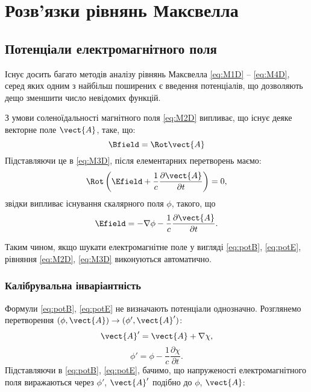 
\chapter{Розв’язки рівнянь Максвелла}\label{\currfilebase}

\section{Потенціали електромагнітного поля}

Існує досить багато методів аналізу рівнянь Максвелла \eqref{eq:M1D} -- \eqref{eq:M4D}, серед яких одним з найбільш поширених є введення потенціалів, що
дозволяють дещо
зменшити число невідомих функцій.

З умови соленоїдальності магнітного поля \eqref{eq:M2D} випливає, що існує деяке векторне поле $\vect{A}$, таке, що:
\begin{equation}\label{eq:potB}
	 \Bfield = \Rot\vect{A}
\end{equation}
Підставляючи це в \eqref{eq:M3D}, після елементарних перетворень маємо:
\begin{equation*}
	\Rot \left( \Efield + \frac{1}{c} \frac{\partial \vect{A}}{\partial t}\right)  = 0,
\end{equation*}
звідки випливає існування скалярного поля $\phi$, такого, що
\begin{equation}\label{eq:potE}
	\Efield = -\nabla \phi - \frac{1}{c} \frac{\partial \vect{A}}{\partial t}.
\end{equation}

Таким чином, якщо шукати електромагнітне поле у вигляді \eqref{eq:potB}, \eqref{eq:potE}, рівняння \eqref{eq:M2D}, \eqref{eq:M3D} виконуються
автоматично.

\subsection*{Калібрувальна інваріантність}

Формули \eqref{eq:potB}, \eqref{eq:potE} не визначають потенціали однозначно. Розглянемо перетворення $(\phi, \vect{A}) \to (\phi', \vect{A}')$:
\begin{equation}\label{eq:A'}
	\vect{A}' = \vect{A} + \nabla \chi,
\end{equation}
\begin{equation}\label{eq:phi'}
	\phi' = \phi - \frac{1}{c} \frac{\partial \chi}{\partial t}.
\end{equation}
Підставляючи в \eqref{eq:potB}, \eqref{eq:potE}, бачимо, що напруженості електромагнітного
поля виражаються через $\phi'$, $\vect{A}'$ подібно до $\phi$, $\vect{A}$:

